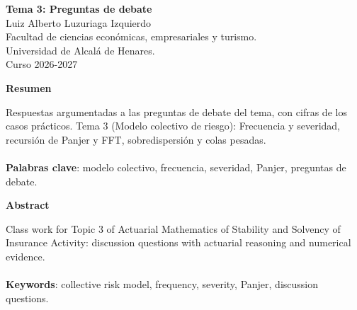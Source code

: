\documentclass[a4paper,12pt]{article}
\begin{document}
\begin{titlepage}
    \centering
    \vspace*{0.1cm}
    \huge\textbf{Tema 3: Preguntas de debate}\\
    \vspace{1cm}
    \small{Luiz Alberto Luzuriaga Izquierdo}\\
    \vspace{0.1cm}
    Facultad de ciencias económicas, empresariales y turismo. \\
    \vspace{0.1cm}
    Universidad de Alcalá de Henares. \\
    \vspace{0.1cm}
    Curso 2026-2027\\
    \vspace{0.5cm}

{\bfseries Resumen}

\vspace{0.1cm}
\noindent
\begin{justify}
Respuestas argumentadas a las preguntas de debate del tema, con cifras de los casos prácticos. Tema 3 (Modelo colectivo de riesgo): Frecuencia y severidad, recursión de Panjer y FFT, sobredispersión y colas pesadas.\\\\
\vspace{0.1cm}
\noindent
\textbf{Palabras clave}: modelo colectivo, frecuencia, severidad, Panjer, preguntas de debate.
\end{justify}
\begin{center}
    {\bfseries Abstract}
\end{center}
\vspace{0.1cm}
\noindent
\begin{justify}
Class work for Topic 3 of Actuarial Mathematics of Stability and Solvency of Insurance Activity: discussion questions with actuarial reasoning and numerical evidence.\\\\
\vspace{0.1cm}
\noindent
\textbf{Keywords}: collective risk model, frequency, severity, Panjer, discussion questions.
\end{justify}

\end{titlepage}

\newpage{}
\renewcommand{\contentsname}{Índice}
\tableofcontents
\end{document}
